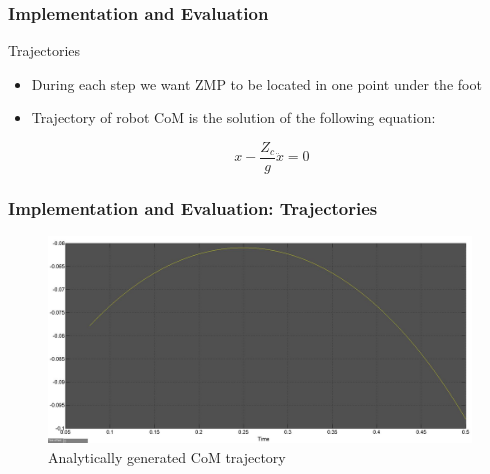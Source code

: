 \documentclass{beamer}
\begin{document}
	\begin{frame}
		\frametitle{Implementation and Evaluation}
		\begin{block}{Trajectories}
			\begin{itemize}
				\item
					During each step we want ZMP to be located in one point under the foot	
				\item
					Trajectory of robot CoM is the solution of the following equation:
					
					\begin{equation}
						x - \dfrac{Z_c}{g} \ddot{x} = 0
					\end{equation}
			\end{itemize}
		\end{block}
	\end{frame}
	

	\begin{frame}
		\frametitle{Implementation and Evaluation: Trajectories}
		\begin{figure}[h!]
			\centering
			\includegraphics[width=\linewidth]{presentation_images/27}
			\caption{Analytically generated CoM trajectory}
		\end{figure}
	\end{frame}
	
\end{document}
